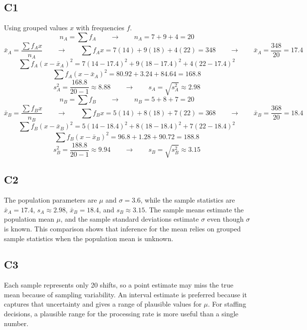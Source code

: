 \begin{ExamProblems}
		\subsection*{C1}
		Using grouped values $x$ with frequencies $f$.
		\[
		n_A = \sum f_A \qquad \longrightarrow \qquad n_A = 7 + 9 + 4 = 20
		\]
		\[
		\bar{x}_A = \frac{\sum f_A x}{n_A} \qquad \longrightarrow \qquad \sum f_A x = 7(14) + 9(18) + 4(22) = 348  \qquad \longrightarrow \qquad \bar{x}_A = \frac{348}{20} = 17.4
		\]
		\[
		\sum f_A(x-\bar{x}_A)^2 = 7(14-17.4)^2 + 9(18-17.4)^2 + 4(22-17.4)^2
		\]
		\[
		\sum f_A(x-\bar{x}_A)^2 = 80.92 + 3.24 + 84.64 = 168.8
		\]
		\[
		s_A^2 = \frac{168.8}{20-1} \approx 8.88 \qquad \longrightarrow \qquad s_A = \sqrt{s_A^2} \approx 2.98
		\]
		\[
		n_B = \sum f_B \qquad \longrightarrow \qquad n_B = 5 + 8 + 7 = 20
		\]
		\[
		\bar{x}_B = \frac{\sum f_B x}{n_B} \qquad \longrightarrow \qquad \sum f_B x = 5(14) + 8(18) + 7(22) = 368  \qquad \longrightarrow \qquad \bar{x}_B = \frac{368}{20} = 18.4
		\]
		\[
		\sum f_B(x-\bar{x}_B)^2 = 5(14-18.4)^2 + 8(18-18.4)^2 + 7(22-18.4)^2
		\]
		\[
		\sum f_B(x-\bar{x}_B)^2 = 96.8 + 1.28 + 90.72 = 188.8
		\]
		\[
		s_B^2 = \frac{188.8}{20-1} \approx 9.94 \qquad \longrightarrow \qquad s_B = \sqrt{s_B^2} \approx 3.15
		\]

		\subsection*{C2}
		The population parameters are $\mu$ and $\sigma = 3.6$, while the sample statistics are $\bar{x}_A = 17.4$, $s_A \approx 2.98$, $\bar{x}_B = 18.4$, and $s_B \approx 3.15$. The sample means estimate the population mean $\mu$, and the sample standard deviations estimate $\sigma$ even though $\sigma$ is known. This comparison shows that inference for the mean relies on grouped sample statistics when the population mean is unknown.

		\subsection*{C3}
		Each sample represents only 20 shifts, so a point estimate may miss the true mean because of sampling variability. An interval estimate is preferred because it captures that uncertainty and gives a range of plausible values for $\mu$. For staffing decisions, a plausible range for the processing rate is more useful than a single number.


\end{ExamProblems}
